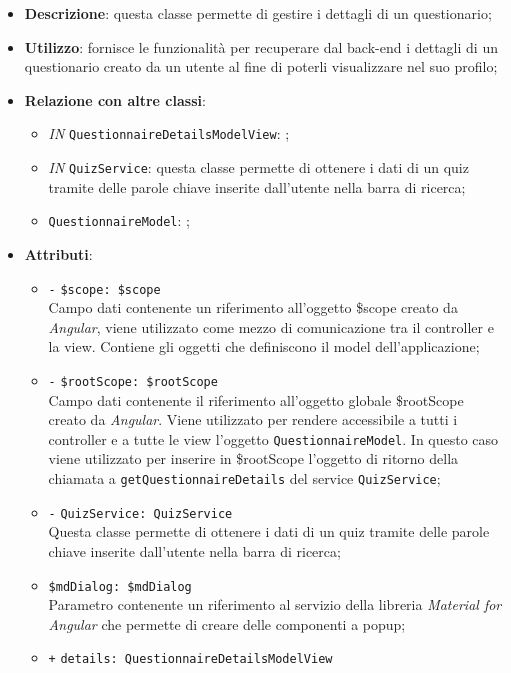 \begin{itemize}
	\item \textbf{Descrizione}: questa classe permette di gestire i dettagli di un questionario; 
	\item \textbf{Utilizzo}: fornisce le funzionalità per recuperare dal back-end i dettagli di un questionario creato da un utente al fine di poterli visualizzare nel suo profilo;
	\item \textbf{Relazione con altre classi}:
	\begin{itemize}
		\item \textit{IN} \texttt{QuestionnaireDetailsModelView}: ;
		\item \textit{IN} \texttt{QuizService}: questa classe permette di ottenere i dati di un quiz tramite delle parole chiave inserite dall'utente nella barra di ricerca;
		\item \textit{} \texttt{QuestionnaireModel}: ;
	\end{itemize}
	\item \textbf{Attributi}:
	\begin{itemize}
		\item \texttt{-} \texttt{\$scope: \$scope} \\
		Campo dati contenente un riferimento all’oggetto \$scope creato da \textit{Angular}, viene utilizzato come mezzo di comunicazione tra il controller e la view. Contiene gli oggetti che definiscono il model dell’applicazione;
		\item \texttt{-} \texttt{\$rootScope: \$rootScope} \\
		Campo dati contenente il riferimento all'oggetto globale \$rootScope creato da \textit{Angular}. Viene utilizzato per rendere accessibile a tutti i controller e a tutte le view l'oggetto \texttt{QuestionnaireModel}. In questo caso viene utilizzato per inserire in \$rootScope l'oggetto di ritorno della chiamata a \texttt{getQuestionnaireDetails} del service \texttt{QuizService};
		\item \texttt{-} \texttt{QuizService: QuizService} \\ Questa classe permette di ottenere i dati di un quiz tramite delle parole chiave inserite dall'utente nella barra di ricerca;
		\item \texttt{\$mdDialog: \$mdDialog} \\
		Parametro contenente un riferimento al servizio della libreria \textit{Material for Angular} che permette di creare delle componenti a popup;
		\item \texttt{+} \texttt{details: QuestionnaireDetailsModelView} \\

\end{itemize}
\end{itemize}

